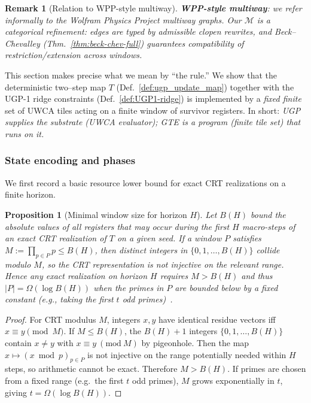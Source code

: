 \documentclass[12pt]{article}
\newtheorem{proposition}[theorem]{Proposition}
\newtheorem{remark}[theorem]{Remark}
\numberwithin{equation}{section}
\begin{document}
\begin{remark}[Relation to WPP-style multiway]\label{rem:mw-wpp}
\textbf{WPP-style multiway}: we refer informally to the Wolfram Physics Project multiway graphs.
Our $\mathcal{M}$ is a categorical refinement: edges are typed by admissible clopen rewrites, and Beck–Chevalley (Thm.~\ref{thm:beck-chev-full}) guarantees compatibility of restriction/extension across windows.
\end{remark}


This section makes precise what we mean by ``the rule.'' We show that the deterministic two–step map \(T\) (Def.~\ref{def:ugp_update_map}) together with the UGP-1 ridge constraints (Def.~\ref{def:UGP1-ridge}) is implemented by a \emph{fixed finite} set of UWCA tiles acting on a finite window of survivor registers. In short: \emph{UGP supplies the substrate (UWCA evaluator); GTE is a program (finite tile set) that runs on it.}


\subsubsection{State encoding and phases}\label{subsec:gte-encoding}

We first record a basic resource lower bound for exact CRT realizations on a finite horizon.

\begin{proposition}[Minimal window size for horizon $H$]\label{prop:min-window}
Let $B(H)$ bound the absolute values of all registers that may occur during the first $H$ macro-steps of an exact CRT realization of $T$ on a given seed. If a window $P$ satisfies $M:=\prod_{p\in P}p\le B(H)$, then distinct integers in $\{0,1,\dots,B(H)\}$ collide modulo $M$, so the CRT representation is not injective on the relevant range. Hence any exact realization on horizon $H$ requires $M>B(H)$ and thus $|P|=\Omega(\log B(H))$ when the primes in $P$ are bounded below by a fixed constant (e.g., taking the first $t$ odd primes)~\cite{SpivackUGPFormalization,ugp-lean}.

\end{proposition}

\begin{proof}
For CRT modulus $M$, integers $x,y$ have identical residue vectors iff $x\equiv y\pmod{M}$. If $M\le B(H)$, the $B(H)+1$ integers $\{0,1,\dots,B(H)\}$ contain $x\ne y$ with $x\equiv y\ (\mathrm{mod}\ M)$ by pigeonhole. Then the map $x\mapsto (x\bmod p)_{p\in P}$ is not injective on the range potentially needed within $H$ steps, so arithmetic cannot be exact. Therefore $M>B(H)$. If primes are chosen from a fixed range (e.g.\ the first $t$ odd primes), $M$ grows exponentially in $t$, giving $t=\Omega(\log B(H))$.
\end{proof}
\end{document}
